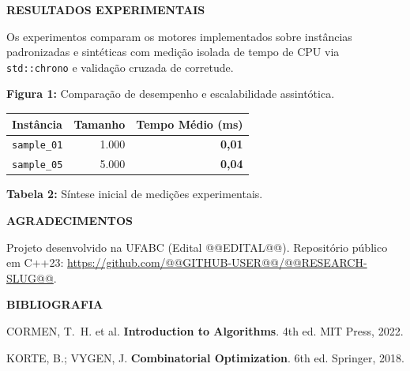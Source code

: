 \documentclass[final]{article}
\newcommand{\destaque}[1]{\textcolor{ufabcgreen}{\textbf{#1}}}
\newcommand{\postersection}[1]{
    \par\vspace{0.55em}
    {\fontsize{34}{40}\selectfont\bfseries\color{textdark}#1}
    \par\vspace{0.2em}
}
\newcommand{\postercaption}[2]{
    \par\vspace{0.22em}
    {\fontsize{25}{30}\selectfont\raggedright\textbf{#1:} #2\par}
    \vspace{0.3em}
}
\begin{document}
\hspace{2.25cm}
\begin{minipage}[t]{41.275cm}
\justifying
\setlength{\parindent}{0pt}
\setlength{\parskip}{0.38em}

\postersection{RESULTADOS EXPERIMENTAIS}
Os experimentos comparam os motores implementados sobre instâncias padronizadas e sintéticas com medição isolada de tempo de CPU via \texttt{std::chrono} e validação cruzada de corretude.

\vspace{0.3em}
\begin{center}
\end{center}
\postercaption{Figura 1}{Comparação de desempenho e escalabilidade assintótica.}

\vspace{0.15em}
{\fontsize{24}{29}\selectfont
\renewcommand{\arraystretch}{1.16}
\setlength{\tabcolsep}{5pt}
\begin{tabular*}{\linewidth}{@{\extracolsep{\fill}}lrr@{}}
\toprule
\textbf{Instância} & \textbf{Tamanho} & \textbf{Tempo Médio (ms)} \\
\midrule
\texttt{sample\_01} & 1.000 & \destaque{0,01} \\
\texttt{sample\_05} & 5.000 & \destaque{0,04} \\
\bottomrule
\end{tabular*}
}
\postercaption{Tabela 2}{Síntese inicial de medições experimentais.}

\postersection{AGRADECIMENTOS}
Projeto desenvolvido na UFABC (Edital @@EDITAL@@). Repositório público em C++23: \url{https://github.com/@@GITHUB-USER@@/@@RESEARCH-SLUG@@}.

\postersection{BIBLIOGRAFIA}
{\fontsize{25}{30}\selectfont
\begin{enumerate}[label={[\arabic*]}, leftmargin=1.8em, itemsep=0.18em, topsep=0.1em]
    \item CORMEN, T.\ H. et al. \textbf{Introduction to Algorithms}. 4th ed. MIT Press, 2022.
    \item KORTE, B.; VYGEN, J. \textbf{Combinatorial Optimization}. 6th ed. Springer, 2018.
\end{enumerate}
}

\end{minipage}
\end{document}

